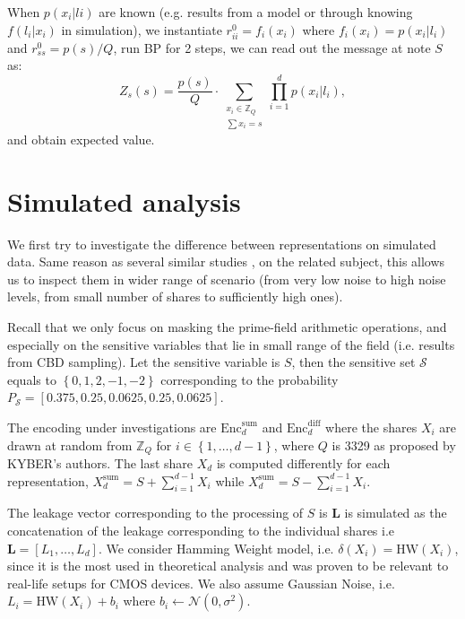 \documentclass{llncs}
\begin{document}
When $p(x_i|li)$ are known (e.g. results from a model or through knowing $f(l_i|x_i)$ in simulation), we instantiate $r^0_{ii} = f_i(x_i)$ where $f_i(x_i) = p(x_i|l_i)$ and $r^0_{ss} = p(s)/Q$, run BP for 2 steps, we can read out the message at note $S$ as:
\begin{equation}
	Z_s(s) = \frac{p(s)}{Q} \cdot\sum_{\substack{x_i\in  \mathbb{Z}_Q \\ \sum x_i = s}} \prod_{i=1}^{d} p\left( x_i|l_i\right), 
\end{equation} 
and obtain expected value.


\section{Simulated analysis} \label{sec:sim}
We first try to investigate the difference between representations on simulated data. Same reason as several similar studies \cite{distinguishers}, \cite{primemask} on the related subject, this allows us to inspect them in wider range of scenario (from very low noise to high noise levels, from small number of shares to sufficiently high ones).

Recall that we only focus on masking the prime-field arithmetic operations, and especially on the sensitive variables that lie in small range of the field (i.e. results from CBD sampling). Let the sensitive variable is $S$, then the sensitive set $\mathcal{S}$ equals to $\left\lbrace 0, 1, 2, -1, -2 \right\rbrace $ corresponding to the probability $P_{\mathcal{S}} = [ 0.375,  0.25,   0.0625, 0.25,   0.0625]$. 

The encoding under investigations are $\text{Enc}^{\text{sum}}_{d}$ and $\text{Enc}^{\text{diff}}_{d}$ where the shares $X_i$ are drawn at random from $\mathbb{Z}_Q$ for $i \in \left\lbrace 1, \dots, d-1\right\rbrace $, where $Q$ is 3329 as proposed by KYBER's authors. The last share $X_d$ is computed differently for each representation, $X_d^{\text{sum}} = S + \sum_{i = 1}^{d-1} X_i$ while $X_d^{\text{sum}} = S - \sum_{i = 1}^{d-1} X_i$.
 
The leakage vector corresponding to the processing of $S$ is $\bm{L}$ is simulated as the concatenation of the leakage corresponding to the individual shares i.e $\bm{L} = \left[ L_1, \dots, L_d \right] $. We consider Hamming Weight model, i.e. $\delta(X_i) = \text{HW}(X_i)$, since it is the most used in theoretical analysis \cite{2dpa} and was proven to be relevant to real-life setups for CMOS devices. We also assume Gaussian Noise, i.e. $L_i = \text{HW}(X_i) + b_i$ where $b_i \leftarrow \mathcal{N}(0, \sigma^2)$. 
\end{document}
